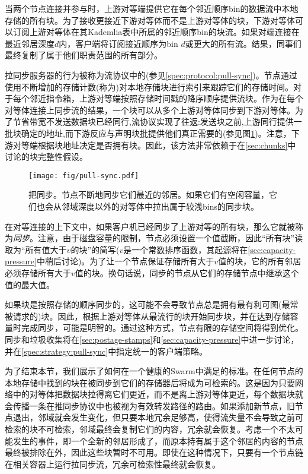 当两个节点连接并参与时，上游对等端提供它在每个邻近顺序bin的数据流中本地存储的所有块。为了接收更接近下游对等体而不是上游对等体的块，下游对等体可以订阅上游对等体在其Kademlia表中所属的邻近顺序bin的块流。如果对端连接在最近邻居深度$d$内，客户端将订阅接近顺序为bin $d$或更大的所有流。结果，同事们最终复制了属于他们职责范围的所有部分。

拉同步服务器的行为被称为流协议中的(参见\ref{spec:protocol:pull-sync})。节点通过使用不断增加的存储计数(称为)对本地存储块进行索引来跟踪它们的存储时间。对于每个邻近指令箱，上游对等端按照存储时间戳的降序顺序提供流块。作为在每个对等体连接上同步流的结果，一个块可以从多个上游对等体同步到下游对等体。为了节省带宽不发送数据块已经同行,流协议实现了往返:发送块之前,上游同行提供一批块确定的地址,而下游反应与声明块批提供他们真正需要的(参见图\ref{fig:pull-syncing})。注意，下游对等端根据块地址决定是否拥有块。因此，该方法非常依赖于在\ref{sec:chunks}中讨论的块完整性假设。


\begin{figure}[htbp]
   \centering
   \texttt{[image: fig/pull-sync.pdf]}
   \caption[把同步\statusgreen]{把同步。节点不断地同步它们最近的邻居。如果它们有空闲容量，它们也会从邻域深度以外的对等体中拉出属于较浅bins的同步块。}
   \label{fig:pull-syncing}
\end{figure}

在对等连接的上下文中，如果客户机已经同步了上游对等的所有块，那么它就被称为\emph{同步}。注意，由于磁盘容量的限制，节点必须设置一个值截断，因此“所有块”读取为“所有值大于$v$的块”的简写($v$是一个常数排序函数，其起源将在\ref{sec:capacity-pressure}中稍后讨论)。为了让一个节点保证存储所有大于$v$值的块，它的所有邻居必须存储所有大于$v$值的块。换句话说，同步的节点从它们的存储节点中继承这个值的最大值。

如果块是按照存储的顺序同步的，这可能不会导致节点总是拥有最有利可图(最常被请求的)块。因此，根据上游对等体从最流行的块开始同步块，并在达到存储容量时完成同步，可能是明智的。通过这种方式，节点有限的存储空间将得到优化。同步和垃圾收集将在\ref{sec:postage-stamps}和\ref{sec:capacity-pressure}中进一步讨论，并在\ref{spec:strategy:pull-sync}中指定统一的客户端策略。

为了结束本节，我们展示了如何在一个健康的Swarm中满足的标准。在任何节点的本地存储中找到的块在被同步到它们的存储器后将成为可检索的。这是因为只要网络中的对等体把数据块拉得离它们更近，而不是离上游对等体更近，每个数据块就会传播一条在推同步协议中也被视为有效转发路径的路由。如果添加新节点，旧节点退出，邻域就会发生变化，但只要本地冗余足够高，使得流失量不会导致之前可检索的块不可检索，邻域最终会复制它们的内容，冗余就会恢复。考虑一个不太可能发生的事件，即一个全新的邻居形成了，而原本持有属于这个邻居的内容的节点最终被排除在外，因此这些块暂时不可用。即使在这种情况下，只要有一个节点链在相关容器上运行拉同步流，冗余可检索性最终就会恢复。

